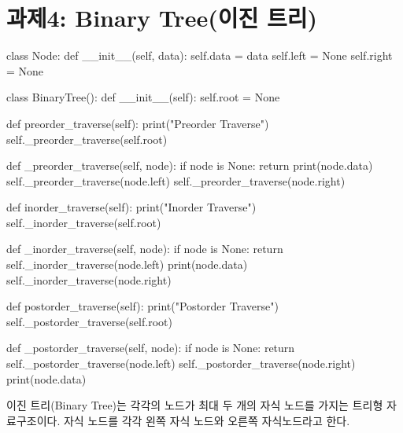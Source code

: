 \documentclass{article}
\begin{document}
\section{과제4: Binary Tree(이진 트리)}
\begin{python}
	class Node:
		def __init__(self, data):
			self.data = data
			self.left = None
			self.right = None

	class BinaryTree():
		def __init__(self):
			self.root = None

		def preorder_traverse(self):
			print("Preorder Traverse")
			self._preorder_traverse(self.root)

		def _preorder_traverse(self, node):
			if node is None: return
			print(node.data)
			self._preorder_traverse(node.left)
			self._preorder_traverse(node.right)

		def inorder_traverse(self):
			print("Inorder Traverse")
			self._inorder_traverse(self.root)

		def _inorder_traverse(self, node):
			if node is None: return
			self._inorder_traverse(node.left)
			print(node.data)
			self._inorder_traverse(node.right)

		def postorder_traverse(self):
			print("Postorder Traverse")
			self._postorder_traverse(self.root)

		def _postorder_traverse(self, node):
			if node is None: return
			self._postorder_traverse(node.left)
			self._postorder_traverse(node.right)
			print(node.data)
\end{python}
이진 트리(Binary Tree)는 각각의 노드가 최대 두 개의 자식 노드를 가지는 트리형 자료구조이다.
자식 노드를 각각 왼쪽 자식 노드와 오른쪽 자식노드라고 한다.
\end{document}

